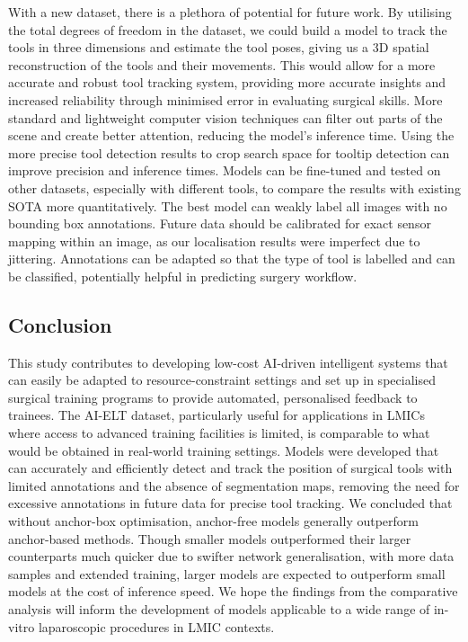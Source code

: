 With a new dataset, there is a plethora of potential for future work. By utilising the total degrees of freedom in the dataset, we could build a model to track the tools in three dimensions and estimate the tool poses, giving us a 3D spatial reconstruction of the tools and their movements. This would allow for a more accurate and robust tool tracking system, providing more accurate insights and increased reliability through minimised error in evaluating surgical skills. More standard and lightweight computer vision techniques can filter out parts of the scene and create better attention, reducing the model's inference time. Using the more precise tool detection results to crop search space for tooltip detection can improve precision and inference times. Models can be fine-tuned and tested on other datasets, especially with different tools, to compare the results with existing SOTA more quantitatively. The best model can weakly label all images with no bounding box annotations. Future data should be calibrated for exact sensor mapping within an image, as our localisation results were imperfect due to jittering. Annotations can be adapted so that the type of tool is labelled and can be classified, potentially helpful in predicting surgery workflow.

\subsection{Conclusion}
 
This study contributes to developing low-cost AI-driven intelligent systems that can easily be adapted to resource-constraint settings and set up in specialised surgical training programs to provide automated, personalised feedback to trainees. The AI-ELT dataset, particularly useful for applications in LMICs where access to advanced training facilities is limited, is comparable to what would be obtained in real-world training settings. Models were developed that can accurately and efficiently detect and track the position of surgical tools with limited annotations and the absence of segmentation maps, removing the need for excessive annotations in future data for precise tool tracking. We concluded that without anchor-box optimisation, anchor-free models generally outperform anchor-based methods. Though smaller models outperformed their larger counterparts much quicker due to swifter network generalisation, with more data samples and extended training, larger models are expected to outperform small models at the cost of inference speed. We hope the findings from the comparative analysis will inform the development of models applicable to a wide range of in-vitro laparoscopic procedures in LMIC contexts. 

